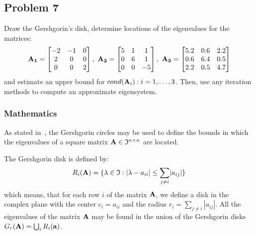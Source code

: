 \subsection{Problem 7}%
\label{sec:problem_7}

Draw the Gershgorin's disk, determine locations of the eigenvalues for the matrices:
\begin{equation*}
    \matr{A_1} = 
    \begin{bmatrix}
        -2 & -1 &  0\\
         2 &  0 &  0\\
         0 &  0 &  2
    \end{bmatrix},\ 
    \matr{A_2} = 
    \begin{bmatrix}
        5 & 1 &  1\\
        0 & 6 &  1\\
        0 & 0 &  -5
    \end{bmatrix},\ 
    \matr{A_3} = 
    \begin{bmatrix}
        5.2 &  0.6 &  2.2\\
        0.6 &  6.4 &  0.5\\
        2.2 &  0.5 &  4.7
    \end{bmatrix}
\end{equation*}
and estimate an upper bound for $cond(\mathbf{A}_i) : i = 1, \ldots, 3$.
Then, use any iteration methods to compute an approximate eigensystem.
\subsubsection*{Mathematics}
As stated in~\cite{Zdunek}, the Gershgorin circles may be used to define the bounds in
which the eigenvalues of a square matrix $\mathbf{A}\in\mathfrak{I}^{n\times{}n}$ are
located.

The Gershgorin disk is defined by:
\begin{equation}
    R_i(\mathbf{A}) = \{\lambda\in\mathfrak{I}:\lvert\lambda-a_{ii}\rvert\le\sum_{j\ne{}i}\lvert{}a_{ij}\rvert\}
\end{equation}
which means, that for each row $i$ of the matrix $\mathbf{A}$, we define a disk in the
complex plane with the center $c_i = a_{ii}$ and the radius $r_i = \sum_{j \neq i} |a_{ij}|$.
All the eigenvalues of the matrix $\mathbf{A}$ may be found in the union of the Gershgorin
disks $G_r(\mathbf{A}) = \bigcup_i R_i(\mathbf{a})$.


